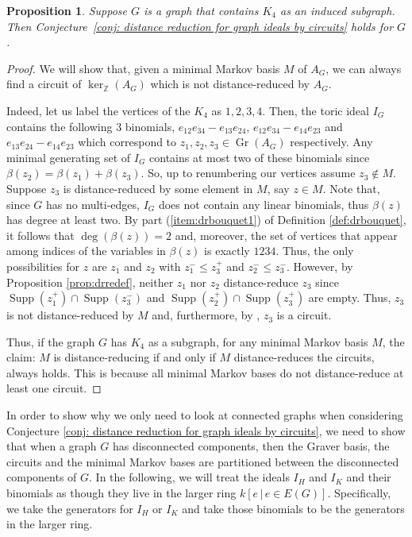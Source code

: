 \documentclass[a4paper, 12pt]{article}
\newcommand{\ZZ}{\mathbb Z}
\theoremstyle{plain}
\newtheorem{proposition}[theorem]{Proposition}
\theoremstyle{definition}
\theoremstyle{remark}
\newtheorem{remark}[theorem]{Remark}
\begin{document}
\begin{proposition} \label{prop:noK4s}
    Suppose $G$ is a graph that contains $K_4$ as an induced subgraph. Then Conjecture~\ref{conj: distance reduction for graph ideals by circuits} holds for $G$.
\end{proposition}

\begin{proof}
    We will show that, given a minimal Markov basis $M$ of $A_G$, we can always find a circuit of $\ker_\ZZ(A_G)$ which is not distance-reduced by $A_G$.

    Indeed, let us label the vertices of the $K_4$ as $1,2,3,4$. Then, the toric ideal $I_G$ contains the following 3 binomials, $e_{12}e_{34}-e_{13}e_{24}$, $e_{12}e_{34}-e_{14}e_{23}$ and $e_{13}e_{24}-e_{14}e_{23}$ which correspond to $z_1,z_2,z_3 \in \operatorname{Gr}(A_G)$ respectively. Any minimal generating set of $I_G$ contains at most two of these binomials since $\beta(z_2)=\beta(z_1)+\beta(z_3)$. So, up to renumbering our vertices assume $z_3 \not\in M$. Suppose $z_3$ is distance-reduced by some element in $M$,
    say $z \in M$. Note that, since $G$ has no multi-edges, $I_G$ does not contain any linear binomials, thus $\beta(z)$ has degree at least two. By part (\ref{item:drbouquet1}) of Definition \ref{def:drbouquet}, it follows that $\deg(\beta(z)) = 2$ and, moreover, the set of vertices that appear among indices of the variables in $\beta(z)$ is exactly $1234$. Thus, the only possibilities for $z$ are $z_1$ and $z_2$ with $z_1^- \le z_3^+$ and $z_2^- \le z_3^-$.
    However, by Proposition \ref{prop:drredef}, neither $z_1$ nor $z_2$ distance-reduce $z_3$ since $\operatorname{Supp}(z_1^+) \cap \operatorname{Supp}(z_3^-)$ and $\operatorname{Supp}(z_2^+) \cap \operatorname{Supp}(z_3^+)$ are empty. Thus, $z_3$ is not distance-reduced by $M$ and, furthermore, by \cite[Proposition 4.2]{Vil_1995}, $z_3$ is a circuit.

    Thus, if the graph $G$ has $K_4$ as a subgraph, for any minimal Markov basis $M$, the claim: $M$ is distance-reducing if and only if $M$ distance-reduces the circuits, always holds. This is because all minimal Markov bases do not distance-reduce at least one circuit.
\end{proof}



In order to show why we only need to look at connected graphs when considering Conjecture \ref{conj: distance reduction for graph ideals by circuits}, we need to show that when a graph $G$ has disconnected components, then the Graver basis, the circuits and the minimal Markov bases are partitioned between the disconnected components of $G$.
In the following, we will treat the ideals $I_H$ and $I_K$ and their binomials as though they live in the larger ring $k[e\,|\, e \in E(G)]$. Specifically, we take the generators for $I_H$ or $I_K$ and take those binomials to be the generators in the larger ring.
\end{document}
